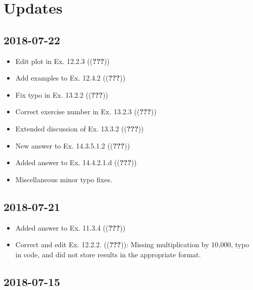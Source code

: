 \documentclass[]{book}
\providecommand{\tightlist}{%
  \setlength{\itemsep}{0pt}\setlength{\parskip}{0pt}}
\theoremstyle{plain}
\theoremstyle{remark}
\theoremstyle{definition}
\theoremstyle{definition}
\theoremstyle{definition}
\theoremstyle{remark}
\begin{document}
\hypertarget{updates}{%
\section*{Updates}\label{updates}}

\hypertarget{section}{%
\subsection*{2018-07-22}\label{section}}

\begin{itemize}
\tightlist
\item
  Edit plot in Ex. 12.2.3 (({\textbf{???}}))
\item
  Add examples to Ex. 12.4.2 (({\textbf{???}}))
\item
  Fix typo in Ex. 13.2.2 (({\textbf{???}}))
\item
  Correct exercise number in Ex. 13.2.3 (({\textbf{???}}))
\item
  Extended discussion of Ex. 13.3.2 (({\textbf{???}}))
\item
  New answer to Ex. 14.3.5.1.2 (({\textbf{???}}))
\item
  Added answer to Ex. 14.4.2.1.d (({\textbf{???}}))
\item
  Miscellaneous minor typo fixes.
\end{itemize}

\hypertarget{section-1}{%
\subsection*{2018-07-21}\label{section-1}}

\begin{itemize}
\tightlist
\item
  Added answer to Ex. 11.3.4 (({\textbf{???}}))
\item
  Correct and edit Ex. 12.2.2. (({\textbf{???}})): Missing
  multiplication by 10,000, typo in code, and did not store results in
  the appropriate format.
\end{itemize}

\hypertarget{section-2}{%
\subsection*{2018-07-15}\label{section-2}}
\end{document}

